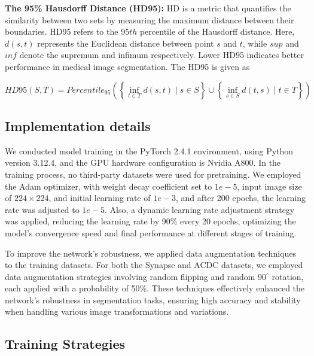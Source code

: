 \documentclass[sn-mathphys-num]{sn-jnl}
\theoremstyle{thmstyleone}%
\theoremstyle{thmstyletwo}%
\theoremstyle{thmstylethree}%
\begin{document}
\textbf{The 95\% Hausdorff Distance (HD95):}
HD is a metric that quantifies the similarity between two sets by measuring the maximum distance between their boundaries\cite{huttenlocher1993comparing,chen2021transunet}.
HD95 refers to the \(95th\) percentile of the Hausdorff distance.
Here, \(d\left( s,t \right)\) represents the Euclidean distance between point \(s\) and \(t\), while \(sup\) and \(inf\) denote the supremum and infimum respectively.
Lower HD95 indicates better performance in medical image segmentation.
The HD95 is given as

\begin{equation}
    HD95(S, T) = Percentile_{95}\left( \left\{ \inf_{t \in T} d(s, t) \mid s \in S \right\} \cup \left\{ \inf_{s \in S} d(t, s) \mid t \in T \right\} \right) \label{eq12}
\end{equation}

\subsection{Implementation details}\label{subsec6}

We conducted model training in the PyTorch 2.4.1 environment, using Python version 3.12.4, and the GPU hardware configuration is Nvidia A800.
In the training process, no third-party datasets were used for pretraining.
We employed the Adam optimizer, with weight decay coefficient set to \(1e-5\), input image size of \(224\times 224\), and initial learning rate of \(1e-3\), and after 200 epochs, the learning rate was adjusted to \(1e-5\).
Also, a dynamic learning rate adjustment strategy was applied, reducing the learning rate by 90\% every 20 epochs, optimizing the model's convergence speed and final performance at different stages of training.	

To improve the network's robustness, we applied data augmentation techniques to the training datasets.
For both the Synapse and ACDC datasets, we employed data augmentation strategies involving random flipping and random \(90^{\circ}\) rotation, each applied with a probability of 50\%.
These techniques effectively enhanced the network's robustness in segmentation tasks, ensuring high accuracy and stability when handling various image transformations and variations.

\subsection{Training Strategies}
\end{document}
